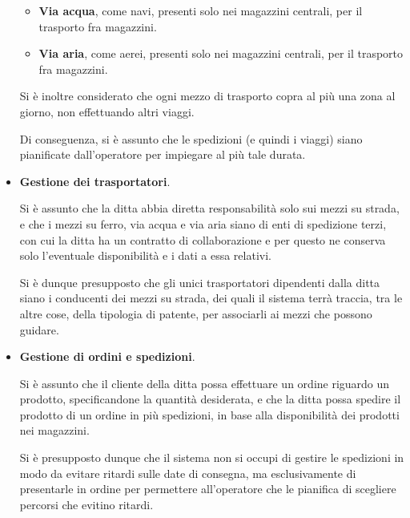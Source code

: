 \begin{itemize}
\begin{itemize}
    \item \textbf{Via acqua}, come navi, presenti solo nei magazzini centrali, per il trasporto fra magazzini.
    
    \item \textbf{Via aria}, come aerei, presenti solo nei magazzini centrali, per il trasporto fra magazzini.
  
  \end{itemize}

  Si è inoltre considerato che ogni mezzo di trasporto copra al più una zona al giorno, non effettuando altri viaggi.

  Di conseguenza, si è assunto che le spedizioni (e quindi i viaggi) siano pianificate dall'operatore per impiegare al più tale durata.

  \item \textbf{Gestione dei trasportatori}\label{transporterManagement}.
  
  Si è assunto che la ditta abbia diretta responsabilità solo sui mezzi su strada, e che i mezzi su ferro, via acqua e via aria siano di enti di spedizione terzi, con cui la ditta ha un contratto di collaborazione e per questo ne conserva solo l'eventuale disponibilità e i dati a essa relativi.

  Si è dunque presupposto che gli unici trasportatori dipendenti dalla ditta siano i conducenti dei mezzi su strada, dei quali il sistema terrà traccia, tra le altre cose, della tipologia di patente, per associarli ai mezzi che possono guidare.

  \item \textbf{Gestione di ordini e spedizioni}.
  
  Si è assunto che il cliente della ditta possa effettuare un ordine riguardo un prodotto, specificandone la quantità desiderata, e che la ditta possa spedire il prodotto di un ordine in più spedizioni, in base alla disponibilità dei prodotti nei magazzini.

  Si è presupposto dunque che il sistema non si occupi di gestire le spedizioni in modo da evitare ritardi sulle date di consegna, ma esclusivamente di presentarle in ordine per permettere all'operatore che le pianifica di scegliere percorsi che evitino ritardi.

\end{itemize}
